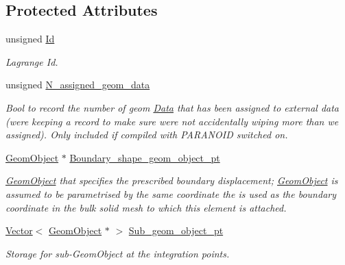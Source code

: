 \subsection*{Protected Attributes}
\begin{DoxyCompactItemize}
\item 
unsigned \hyperlink{classoomph_1_1ImposeDisplacementByLagrangeMultiplierElement_a34eff65966642b9afdc812c8e758d837}{Id}
\begin{DoxyCompactList}\small\item\em Lagrange Id. \end{DoxyCompactList}\item 
unsigned \hyperlink{classoomph_1_1ImposeDisplacementByLagrangeMultiplierElement_a152b5d78d73fa32a82153b32633794c0}{N\+\_\+assigned\+\_\+geom\+\_\+data}
\begin{DoxyCompactList}\small\item\em Bool to record the number of geom \hyperlink{classoomph_1_1Data}{Data} that has been assigned to external data (we\textquotesingle{}re keeping a record to make sure we\textquotesingle{}re not accidentally wiping more than we assigned). Only included if compiled with P\+A\+R\+A\+N\+O\+ID switched on. \end{DoxyCompactList}\item 
\hyperlink{classoomph_1_1GeomObject}{Geom\+Object} $\ast$ \hyperlink{classoomph_1_1ImposeDisplacementByLagrangeMultiplierElement_a97f265e6d79381df4fa00bf1af174f52}{Boundary\+\_\+shape\+\_\+geom\+\_\+object\+\_\+pt}
\begin{DoxyCompactList}\small\item\em \hyperlink{classoomph_1_1GeomObject}{Geom\+Object} that specifies the prescribed boundary displacement; \hyperlink{classoomph_1_1GeomObject}{Geom\+Object} is assumed to be parametrised by the same coordinate the is used as the boundary coordinate in the bulk solid mesh to which this element is attached. \end{DoxyCompactList}\item 
\hyperlink{classoomph_1_1Vector}{Vector}$<$ \hyperlink{classoomph_1_1GeomObject}{Geom\+Object} $\ast$ $>$ \hyperlink{classoomph_1_1ImposeDisplacementByLagrangeMultiplierElement_a3049f33a38a6566d74e1201f890ddc75}{Sub\+\_\+geom\+\_\+object\+\_\+pt}
\begin{DoxyCompactList}\small\item\em Storage for sub-\/\+Geom\+Object at the integration points. \end{DoxyCompactList}\item 

\end{DoxyCompactItemize}
